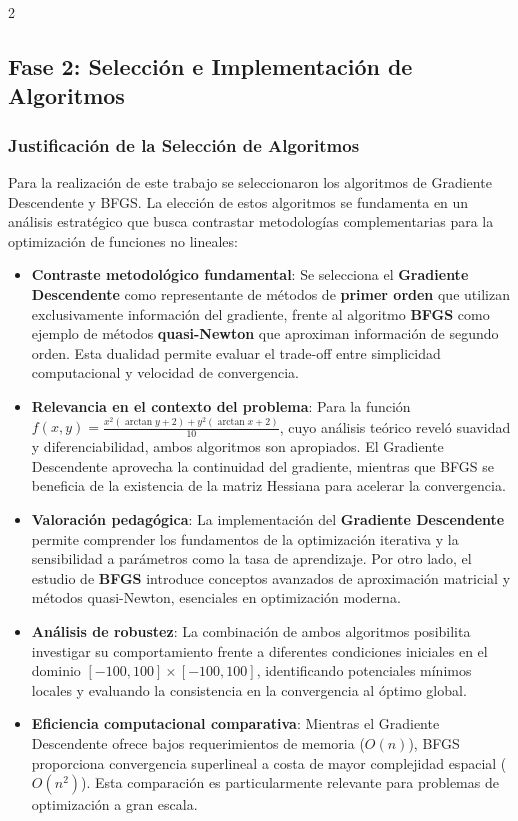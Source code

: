 \documentclass[11pt, a4paper, twocolumn]{beamer}
\begin{document}
\begin{multicols}{2}
\subsection{Fase 2: Selección e Implementación de Algoritmos}

\subsubsection{Justificación de la Selección de Algoritmos}

Para la realización de este trabajo se seleccionaron los algoritmos de Gradiente Descendente y BFGS. La elección de estos algoritmos se fundamenta en un análisis estratégico que busca contrastar metodologías complementarias para la optimización de funciones no lineales:

\begin{itemize}
	\item \textbf{Contraste metodológico fundamental}: Se selecciona el \textbf{Gradiente Descendente} como representante de métodos de \textbf{primer orden} que utilizan exclusivamente información del gradiente, frente al algoritmo \textbf{BFGS} como ejemplo de métodos \textbf{quasi-Newton} que aproximan información de segundo orden. Esta dualidad permite evaluar el trade-off entre simplicidad computacional y velocidad de convergencia.
	
	\item \textbf{Relevancia en el contexto del problema}: Para la función $f(x,y) = \frac{x^2 (\arctan y + 2) + y^2 (\arctan x + 2)}{10}$, cuyo análisis teórico reveló suavidad y diferenciabilidad, ambos algoritmos son apropiados. El Gradiente Descendente aprovecha la continuidad del gradiente, mientras que BFGS se beneficia de la existencia de la matriz Hessiana para acelerar la convergencia.
	
	\item \textbf{Valoración pedagógica}: La implementación del \textbf{Gradiente Descendente} permite comprender los fundamentos de la optimización iterativa y la sensibilidad a parámetros como la tasa de aprendizaje. Por otro lado, el estudio de \textbf{BFGS} introduce conceptos avanzados de aproximación matricial y métodos quasi-Newton, esenciales en optimización moderna.
	
	\item \textbf{Análisis de robustez}: La combinación de ambos algoritmos posibilita investigar su comportamiento frente a diferentes condiciones iniciales en el dominio $[-100, 100] \times [-100, 100]$, identificando potenciales mínimos locales y evaluando la consistencia en la convergencia al óptimo global.
	
	\item \textbf{Eficiencia computacional comparativa}: Mientras el Gradiente Descendente ofrece bajos requerimientos de memoria ($O(n)$), BFGS proporciona convergencia superlineal a costa de mayor complejidad espacial ($O(n^2)$). Esta comparación es particularmente relevante para problemas de optimización a gran escala.
\end{itemize}
 \end{multicols}
\end{document}

